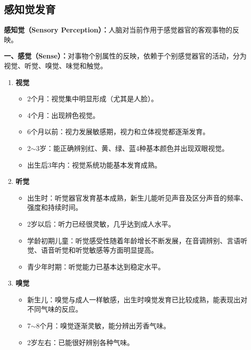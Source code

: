 \subsection{感知觉发育}

\begin{keybox}
\textbf{感知觉（Sensory Perception）：}人脑对当前作用于感觉器官的客观事物的反映。

\textbf{一、感觉（Sense）：}对事物个别属性的反映，依赖于个别感觉器官的活动，分为视觉、听觉、嗅觉、味觉和触觉。

\begin{enumerate}[leftmargin=*]
    \item \textbf{视觉}
    \begin{itemize}[leftmargin=*]
        \item 2个月：视觉集中明显形成（尤其是人脸）。
        \item 4个月：出现辨色视觉。
        \item 6个月以前：视力发展敏感期，视力和立体视觉都逐渐发育。
        \item 2$\sim$3岁：能正确辨别红、黄、绿、蓝4种基本颜色并出现双眼视觉。
        \item 出生后3年内：视觉系统功能基本发育成熟。
    \end{itemize}

    \item \textbf{听觉}
    \begin{itemize}[leftmargin=*]
        \item 出生时：听觉器官发育基本成熟，新生儿能听见声音及区分声音的频率、强度和持续时间。
        \item 2岁以后：听力已经很灵敏，几乎达到成人水平。
        \item 学龄初期儿童：听觉感受性随着年龄增长不断发展，在音调辨别、言语听觉、语音听觉和听觉敏感等方面明显提高。
        \item 青少年时期：听觉能力已基本达到稳定水平。
    \end{itemize}

    \item \textbf{嗅觉}
    \begin{itemize}[leftmargin=*]
        \item 新生儿：嗅觉与成人一样敏感，出生时嗅觉发育已比较成熟，能表现出对不同气味的反应。
        \item 7$\sim$8个月：嗅觉逐渐灵敏，能分辨出芳香气味。
        \item 2岁左右：已能很好辨别各种气味。
    \end{itemize}


\end{enumerate}
\end{keybox}
